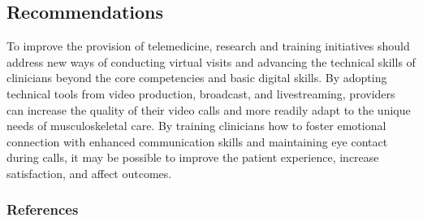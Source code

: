 \documentclass[
  letterpaper,
  DIV=11,
  numbers=noendperiod,
  oneside]{scrartcl}
\begin{document}
\subsection{Recommendations}\label{recommendations}

To improve the provision of telemedicine, research and training
initiatives should address new ways of conducting virtual visits and
advancing the technical skills of clinicians beyond the core
competencies and basic digital skills. By adopting technical tools from
video production, broadcast, and livestreaming, providers can increase
the quality of their video calls and more readily adapt to the unique
needs of musculoskeletal care. By training clinicians how to foster
emotional connection with enhanced communication skills and maintaining
eye contact during calls, it may be possible to improve the patient
experience, increase satisfaction, and affect outcomes.

\subsubsection*{References}\label{references}
\end{document}
